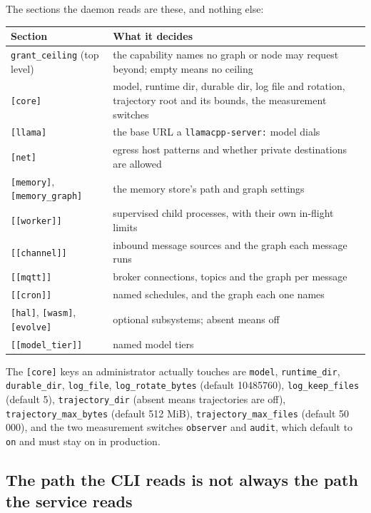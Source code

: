 The sections the daemon reads are these, and nothing else:

\begin{center}
\begin{tabular}{@{}p{}p{}@{}}
	\toprule
	\textbf{Section} & \textbf{What it decides} \\
	\midrule
	\texttt{grant\_ceiling} (top level) & the capability names no graph or node may request
	beyond; empty means no ceiling \\
	\texttt{[core]} & model, runtime dir, durable dir, log file and rotation, trajectory
	root and its bounds, the measurement switches \\
	\texttt{[llama]} & the base URL a \texttt{llamacpp-server:} model dials \\
	\texttt{[net]} & egress host patterns and whether private destinations are allowed \\
	\texttt{[memory]}, \texttt{[memory\_graph]} & the memory store's path and graph
	settings \\
	\texttt{[[worker]]} & supervised child processes, with their own in-flight limits \\
	\texttt{[[channel]]} & inbound message sources and the graph each message runs \\
	\texttt{[[mqtt]]} & broker connections, topics and the graph per message \\
	\texttt{[[cron]]} & named schedules, and the graph each one names \\
	\texttt{[hal]}, \texttt{[wasm]}, \texttt{[evolve]} & optional subsystems; absent means
	off \\
	\texttt{[[model\_tier]]} & named model tiers \\
	\bottomrule
\end{tabular}
\end{center}

The \texttt{[core]} keys an administrator actually touches are
\texttt{model}, \texttt{runtime\_dir}, \texttt{durable\_dir}, \texttt{log\_file},
\texttt{log\_rotate\_bytes} (default 10485760), \texttt{log\_keep\_files} (default 5),
\texttt{trajectory\_dir} (absent means trajectories are off),
\texttt{trajectory\_max\_bytes} (default 512 MiB), \texttt{trajectory\_max\_files}
(default 50\,000), and the two measurement switches \texttt{observer} and \texttt{audit},
which default to \texttt{on} and must stay on in production.

\subsection*{The path the CLI reads is not always the path the service reads}

